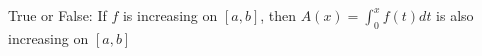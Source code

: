 \documentclass{ximera}
\author{Steven Gubkin}
\begin{document}
\begin{exercise}

True or False:  If $f$ is increasing on $[a,b]$, then $A(x) = \int_0^x f(t) dt$ is also increasing on $[a,b]$


\begin{prompt}
	\begin{multipleChoice}
	\end{multipleChoice}
\end{prompt}

\end{exercise}
\end{document}
